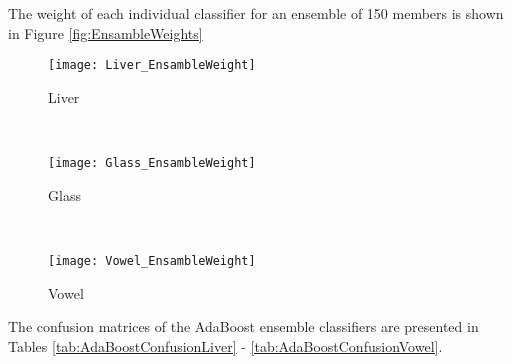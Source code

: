 The weight of each individual classifier for an ensemble of 150 members is shown in Figure \ref{fig:EnsambleWeights}
\begin{figure*}[!ht]
	\centering
	\begin{subfigure}[b]{0.3\textwidth}
		\centering
		\texttt{[image: Liver\_EnsambleWeight]}
      \caption{Liver}
	\end{subfigure}%
	~
	\begin{subfigure}[b]{0.3\textwidth}
		\centering
		\texttt{[image: Glass\_EnsambleWeight]}
        \caption{Glass}
	\end{subfigure}	
    ~
	\begin{subfigure}[b]{0.3\textwidth}
		\centering
		\texttt{[image: Vowel\_EnsambleWeight]}
        \caption{Vowel}
	\end{subfigure}%
	\caption{Distribution of Ensemble Weights}
	\label{fig:EnsambleWeights}
\end{figure*}
The confusion matrices of the AdaBoost ensemble classifiers are presented in Tables \ref{tab:AdaBoostConfusionLiver} - \ref{tab:AdaBoostConfusionVowel}.  
\begin{table}[h!]
\caption{Confusion Matrix for AdaBoost Ensemble (Liver)}
\label{tab:AdaBoostConfusionLiver}
\centering

\end{table}
\begin{table}[h!]
\caption{Confusion Matrix for AdaBoost Ensemble (Glass)}
\label{tab:AdaBoostConfusionGlass}
\centering

\end{table}
\begin{table}[h!]
\caption{Confusion Matrix for AdaBoost Ensemble (Vowel)}
\label{tab:AdaBoostConfusionVowel}
\centering

\end{table}
